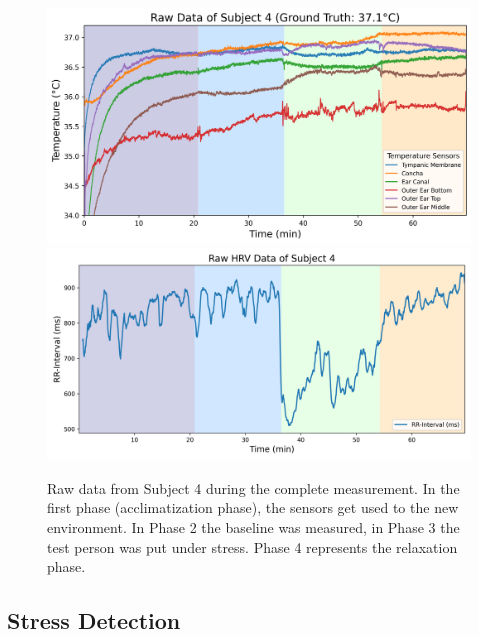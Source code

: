 \begin{figure}[!t]
    \centering
    \includegraphics[width=\textwidth]{thesis-doc/images/study2/p04/Logging_study2_p04_0smoothed_raw_data.png}
    \includegraphics[width=\textwidth]{thesis-doc/images/study2/p04/raw_hrv_data_participant_4.png}
    \caption{Raw data from Subject 4 during the complete measurement. In the first phase (acclimatization phase), the sensors get used to the new environment. In Phase 2 the baseline was measured, in Phase 3 the test person was put under stress. Phase 4 represents the relaxation phase.}
    \label{fig:ch:Evaluation:Study2:RawData}
\end{figure}

\subsection{Stress Detection}
\label{subsec:Evaluation:Study2:ground_truth}

